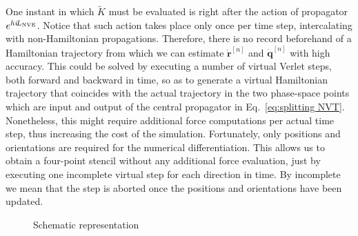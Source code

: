 \documentclass[
journal=jctcce,
layout=twocolumn
]{achemso}
\newcommand{\vt}[1]{\boldsymbol{\mathbf{#1}}}   %
\newcommand{\Liu}[1]{i\!L_\text{#1}}            %
\newcommand{\timestep}{h}
\newcommand{\modified}[1]{\widetilde{#1}}
\begin{document}
One instant in which $\modified K$ must be evaluated is right after the action of propagator $e^{\timestep \Liu{\tiny NVE}}$.
Notice that such action takes place only once per time step, intercalating with non-Hamiltonian propagations.
Therefore, there is no record beforehand of a Hamiltonian trajectory from which we can estimate $\dot{\vt r}^{[n]}$ and $\dot{\vt q}^{[n]}$ with high accuracy.
This could be solved by executing a number of virtual Verlet steps, both forward and backward in time, so as to generate a virtual Hamiltonian trajectory that coincides with the actual trajectory in the two phase-space points which are input and output of the central propagator in Eq.~\eqref{eq:splitting NVT}.
Nonetheless, this might require additional force computations per actual time step, thus increasing the cost of the simulation.
Fortunately, only positions and orientations are required for the numerical differentiation.
This allows us to obtain a four-point stencil without any additional force evaluation, just by executing one incomplete virtual step for each direction in time.
By incomplete we mean that the step is aborted once the positions and orientations have been updated.
\begin{figure}
\caption{Schematic representation}
\label{fig:virtual}
\end{figure}
\end{document}
